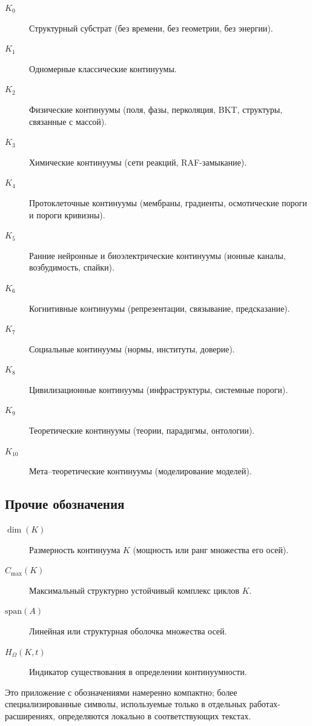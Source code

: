 \begin{description}
  \item[\(K_0\)] Структурный субстрат (без времени, без геометрии, без энергии).
  \item[\(K_1\)] Одномерные классические континуумы.
  \item[\(K_2\)] Физические континуумы (поля, фазы, перколяция, BKT,
        структуры, связанные с массой).
  \item[\(K_3\)] Химические континуумы (сети реакций, RAF-замыкание).
  \item[\(K_4\)] Протоклеточные континуумы (мембраны, градиенты, осмотические
        пороги и пороги кривизны).
  \item[\(K_5\)] Ранние нейронные и биоэлектрические континуумы (ионные каналы,
        возбудимость, спайки).
  \item[\(K_6\)] Когнитивные континуумы (репрезентации, связывание,
        предсказание).
  \item[\(K_7\)] Социальные континуумы (нормы, институты, доверие).
  \item[\(K_8\)] Цивилизационные континуумы (инфраструктуры, системные
        пороги).
  \item[\(K_9\)] Теоретические континуумы (теории, парадигмы, онтологии).
  \item[\(K_{10}\)] Мета--теоретические континуумы (моделирование моделей).
\end{description}

\subsection{Прочие обозначения}

\begin{description}
  \item[\(\dim(K)\)] Размерность континуума \(K\) (мощность или ранг
        множества его осей).
  \item[\(C_{\max}(K)\)] Максимальный структурно устойчивый комплекс циклов
        \(K\).
  \item[\(\mathrm{span}(A)\)] Линейная или структурная оболочка множества осей.
  \item[\(H_{\Omega}(K,t)\)] Индикатор существования в определении
        континуумности.
\end{description}

Это приложение с обозначениями намеренно компактно; более специализированные
символы, используемые только в отдельных работах-расширениях, определяются
локально в соответствующих текстах.
